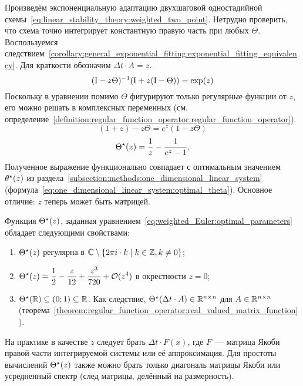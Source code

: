 Произведём экспоненциальную адаптацию двухшаговой одностадийной схемы~\eqref{eq:linear_stability_theory:weighted_two_point}.
Нетрудно проверить, что схема точно интегрирует константную правую часть при любых $ \Theta $.
Воспользуемся следствием~\ref{corollary:general_exponential_fitting:exponential_fitting_equivalency}.
Для краткости обозначим $ \Delta t \cdot A = z $.
\[
    (\mathrm{I} - z \Theta)^{-1} (\mathrm{I} + z (\mathrm{I} - \Theta)) = \exp(z)
\]
Поскольку в уравнении помимо $ \Theta $ фигурируют только регулярные функции от $ z $,
его можно решать в комплексных переменных
(см. определение~\ref{definition:regular_function_operator:regular_function_operator}).
\[
    (1 + z) - z \Theta = e^z (1 - z \Theta)
\]
%
\begin{equation}
    \label{eq:weighted_Euler:optimal_parameters}
    \Theta^\star(z) = \frac{1}{z} - \frac{1}{e^z - 1},
\end{equation}
%
Полученное выражение функционально совпадает с оптимальным значением $ \theta^\star(z) $
из раздела~\ref{subsection:methods:one_dimensional_linear_system}
(формула~\eqref{eq:one_dimensional_linear_system:optimal_theta}).
Основное отличие: $ z $ теперь может быть матрицей.

\begin{remark}
    \label{remark:weighted_Euler:optimal_parameters_properties}
    Функция $ \Theta^\star(z) $, заданная уравнением~\eqref{eq:weighted_Euler:optimal_parameters}
    обладает следующими свойствами:
    \begin{enumerate}
        \item $ \Theta^\star(z) $ регулярна в $ \mathbb{C} \setminus \{ 2 \pi i \cdot k \mid k \in \mathbb{Z}, k \neq 0 \} $;
        \item $ \displaystyle \Theta^\star(z) = \frac{1}{2} - \frac{z}{12} + \frac{z^3}{720} + \mathcal{O}(z^4) $
            в окрестности $ z = 0 $;
        \item $ \Theta^\star(\mathbb{R}) \subseteq (0; 1) \subseteq \mathbb{R} $.
            Как следствие, $ \Theta^\star(\Delta t \cdot A) \in \mathbb{R}^{n \times n} $ для $ A \in \mathbb{R}^{n \times n} $
            (теорема~\ref{theorem:regular_function_operator:real_valued_matrix_function}).
    \end{enumerate}
\end{remark}

На практике в качестве $ z $ следует брать $ \Delta t \cdot F(x) $,
где $ F $~--- матрица Якоби правой части интегрируемой системы или её аппроксимация.
Для простоты вычислений $ \Theta^\star(z) $ также можно брать только диагональ матрицы Якоби
или усредненный спектр (след матрицы, делённый на размерность).


